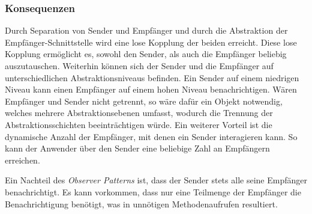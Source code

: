 \subsubsection*{Konsequenzen}

Durch Separation von Sender und Empfänger und durch die Abstraktion der Empfänger-Schnittstelle wird eine lose Kopplung der beiden erreicht. Diese lose Kopplung ermöglicht es, sowohl den Sender, als auch die Empfänger beliebig auszutauschen. Weiterhin können sich der Sender und die Empfänger auf unterschiedlichen Abstraktionsniveaus befinden. Ein Sender auf einem niedrigen Niveau kann einen Empfänger auf einem hohen Niveau benachrichtigen. Wären Empfänger und Sender nicht getrennt, so wäre dafür ein Objekt notwendig, welches mehrere Abstraktionsebenen umfasst, wodurch die Trennung der Abstraktionsschichten beeinträchtigen würde. Ein weiterer Vorteil ist die dynamische Anzahl der Empfänger, mit denen ein Sender interagieren kann. So kann der Anwender über den Sender eine beliebige Zahl an Empfängern erreichen.

Ein Nachteil des \emph{Observer Patterns} ist, dass der Sender stets alle seine Empfänger benachrichtigt. Es kann vorkommen, dass nur eine Teilmenge der Empfänger die Benachrichtigung benötigt, was in unnötigen Methodenaufrufen resultiert. \cite{gamma_design_1995}